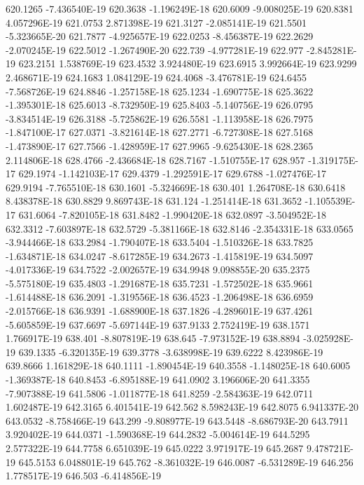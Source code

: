 620.1265  -7.436540E-19
620.3638  -1.196249E-18
620.6009  -9.008025E-19
620.8381  4.057296E-19
621.0753  2.871398E-19
621.3127  -2.085141E-19
621.5501  -5.323665E-20
621.7877  -4.925657E-19
622.0253  -8.456387E-19
622.2629  -2.070245E-19
622.5012  -1.267490E-20
622.739  -4.977281E-19
622.977  -2.845281E-19
623.2151  1.538769E-19
623.4532  3.924480E-19
623.6915  3.992664E-19
623.9299  2.468671E-19
624.1683  1.084129E-19
624.4068  -3.476781E-19
624.6455  -7.568726E-19
624.8846  -1.257158E-18
625.1234  -1.690775E-18
625.3622  -1.395301E-18
625.6013  -8.732950E-19
625.8403  -5.140756E-19
626.0795  -3.834514E-19
626.3188  -5.725862E-19
626.5581  -1.113958E-18
626.7975  -1.847100E-17
627.0371  -3.821614E-18
627.2771  -6.727308E-18
627.5168  -1.473890E-17
627.7566  -1.428959E-17
627.9965  -9.625430E-18
628.2365  2.114806E-18
628.4766  -2.436684E-18
628.7167  -1.510755E-17
628.957  -1.319175E-17
629.1974  -1.142103E-17
629.4379  -1.292591E-17
629.6788  -1.027476E-17
629.9194  -7.765510E-18
630.1601  -5.324669E-18
630.401  1.264708E-18
630.6418  8.438378E-18
630.8829  9.869743E-18
631.124  -1.251414E-18
631.3652  -1.105539E-17
631.6064  -7.820105E-18
631.8482  -1.990420E-18
632.0897  -3.504952E-18
632.3312  -7.603897E-18
632.5729  -5.381166E-18
632.8146  -2.354331E-18
633.0565  -3.944466E-18
633.2984  -1.790407E-18
633.5404  -1.510326E-18
633.7825  -1.634871E-18
634.0247  -8.617285E-19
634.2673  -1.415819E-19
634.5097  -4.017336E-19
634.7522  -2.002657E-19
634.9948  9.098855E-20
635.2375  -5.575180E-19
635.4803  -1.291687E-18
635.7231  -1.572502E-18
635.9661  -1.614488E-18
636.2091  -1.319556E-18
636.4523  -1.206498E-18
636.6959  -2.015766E-18
636.9391  -1.688900E-18
637.1826  -4.289601E-19
637.4261  -5.605859E-19
637.6697  -5.697144E-19
637.9133  2.752419E-19
638.1571  1.766917E-19
638.401  -8.807819E-19
638.645  -7.973152E-19
638.8894  -3.025928E-19
639.1335  -6.320135E-19
639.3778  -3.638998E-19
639.6222  8.423986E-19
639.8666  1.161829E-18
640.1111  -1.890454E-19
640.3558  -1.148025E-18
640.6005  -1.369387E-18
640.8453  -6.895188E-19
641.0902  3.196606E-20
641.3355  -7.907388E-19
641.5806  -1.011877E-18
641.8259  -2.584363E-19
642.0711  1.602487E-19
642.3165  6.401541E-19
642.562  8.598243E-19
642.8075  6.941337E-20
643.0532  -8.758466E-19
643.299  -9.808977E-19
643.5448  -8.686793E-20
643.7911  3.920402E-19
644.0371  -1.590368E-19
644.2832  -5.004614E-19
644.5295  2.577322E-19
644.7758  6.651039E-19
645.0222  3.971917E-19
645.2687  9.478721E-19
645.5153  6.048801E-19
645.762  -8.361032E-19
646.0087  -6.531289E-19
646.256  1.778517E-19
646.503  -6.414856E-19
